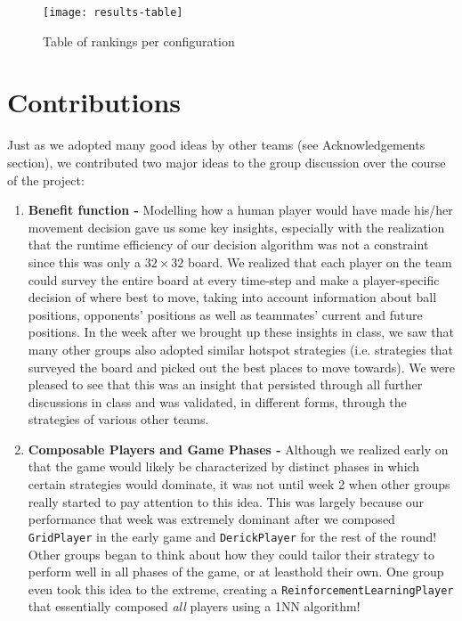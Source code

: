 \documentclass[
10pt, %
letterpaper, %
oneside, %
headinclude,footinclude, %
english
]{article}
\begin{document}
\begin{figure}[h]
\centering
\texttt{[image: results-table]}
\caption[Table of rankings per configuration]{Table of rankings per configuration}
\label{fig:gallery2}
\end{figure}

\section{Contributions}

Just as we adopted many good ideas by other teams (see Acknowledgements section), we contributed two major ideas to the group discussion over the course of the project:

\begin{enumerate}
  \item \textbf{Benefit function - } Modelling how a human player would have made his/her movement decision gave us some key insights, especially with the realization that the runtime efficiency of our decision algorithm was not a constraint since this was only a $32 \times 32$ board. We realized that each player on the team could survey the entire board at every time-step and make a player-specific decision of where best to move, taking into account information about ball positions, opponents' positions as well as teammates' current and future positions. In the week after we brought up these insights in class, we saw that many other groups also adopted similar hotspot strategies (i.e. strategies that surveyed the board and picked out the best places to move towards). We were pleased to see that this was an insight that persisted through all further discussions in class and was validated, in different forms, through the strategies of various other teams.
  \item \textbf{Composable Players and Game Phases - } Although we realized early on that the game would likely be characterized by distinct phases in which certain strategies would dominate, it was not until week 2 when other groups really started to pay attention to this idea. This was largely because our performance that week was extremely dominant after we composed \texttt{GridPlayer} in the early game and \texttt{DerickPlayer} for the rest of the round! Other groups began to think about how they could tailor their strategy to perform well in all phases of the game, or at leasthold their own. One group even took this idea to the extreme, creating a \texttt{ReinforcementLearningPlayer} that essentially composed \textit{all} players using a 1NN algorithm!
\end{enumerate}
\end{document}
